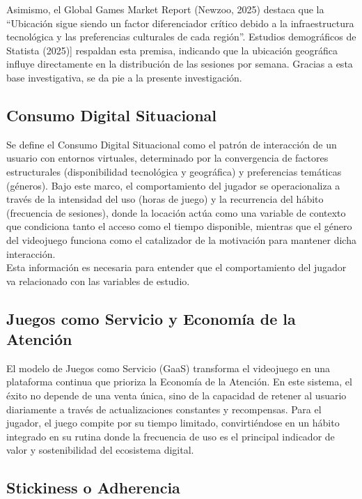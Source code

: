 \documentclass[oneside,11pt]{Latex/Classes/PhDthesisPSnPDF}
\begin{document}
Asimismo, el Global Games Market Report (Newzoo, 2025) destaca que la
``Ubicación sigue siendo un factor diferenciador crítico debido a la
infraestructura tecnológica y las preferencias culturales de cada
región''. Estudios demográficos de Statista (2025){]} respaldan esta
premisa, indicando que la ubicación geográfica influye directamente en
la distribución de las sesiones por semana. Gracias a esta base
investigativa, se da pie a la presente investigación.

\subsection{Consumo Digital Situacional}

Se define el Consumo Digital Situacional como el patrón de interacción
de un usuario con entornos virtuales, determinado por la convergencia de
factores estructurales (disponibilidad tecnológica y geográfica) y
preferencias temáticas (géneros). Bajo este marco, el comportamiento del
jugador se operacionaliza a través de la intensidad del uso (horas de
juego) y la recurrencia del hábito (frecuencia de sesiones), donde la
locación actúa como una variable de contexto que condiciona tanto el
acceso como el tiempo disponible, mientras que el género del videojuego
funciona como el catalizador de la motivación para mantener dicha
interacción.\\

Esta información es necesaria para entender que el comportamiento del
jugador va relacionado con las variables de estudio.

\subsection{Juegos como Servicio y Economía de la Atención}

El modelo de Juegos como Servicio (GaaS) transforma el videojuego en una
plataforma continua que prioriza la Economía de la Atención. En este
sistema, el éxito no depende de una venta única, sino de la capacidad de
retener al usuario diariamente a través de actualizaciones constantes y
recompensas. Para el jugador, el juego compite por su tiempo limitado,
convirtiéndose en un hábito integrado en su rutina donde la frecuencia
de uso es el principal indicador de valor y sostenibilidad del
ecosistema digital.

\subsection{Stickiness o Adherencia}
\end{document}
